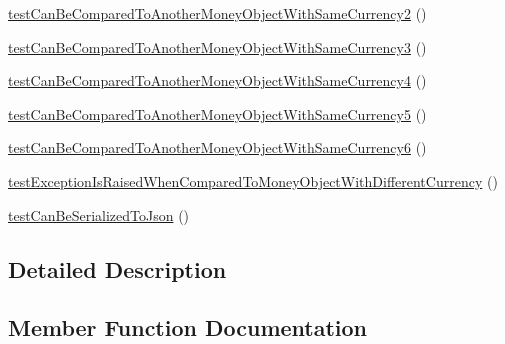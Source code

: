 \begin{DoxyCompactItemize}
\item 
\hyperlink{classSebastianBergmann_1_1Money_1_1MoneyTest_afdad35bd500a87de5765ab7b7a130a4d}{test\+Can\+Be\+Compared\+To\+Another\+Money\+Object\+With\+Same\+Currency2} ()
\item 
\hyperlink{classSebastianBergmann_1_1Money_1_1MoneyTest_a5c6950a2b492a71d2df55c6980288681}{test\+Can\+Be\+Compared\+To\+Another\+Money\+Object\+With\+Same\+Currency3} ()
\item 
\hyperlink{classSebastianBergmann_1_1Money_1_1MoneyTest_af6c446ab0c9910b834a885611ffafea5}{test\+Can\+Be\+Compared\+To\+Another\+Money\+Object\+With\+Same\+Currency4} ()
\item 
\hyperlink{classSebastianBergmann_1_1Money_1_1MoneyTest_a76d4e7b3209896aacdd71c81057ec505}{test\+Can\+Be\+Compared\+To\+Another\+Money\+Object\+With\+Same\+Currency5} ()
\item 
\hyperlink{classSebastianBergmann_1_1Money_1_1MoneyTest_a7eef02cd2ca9496785f5eac1f0339dbd}{test\+Can\+Be\+Compared\+To\+Another\+Money\+Object\+With\+Same\+Currency6} ()
\item 
\hyperlink{classSebastianBergmann_1_1Money_1_1MoneyTest_a9d1db77092880c644027301c166447d3}{test\+Exception\+Is\+Raised\+When\+Compared\+To\+Money\+Object\+With\+Different\+Currency} ()
\item 
\hyperlink{classSebastianBergmann_1_1Money_1_1MoneyTest_ab2c83f141e16316849d0212d2fbf6e13}{test\+Can\+Be\+Serialized\+To\+Json} ()
\end{DoxyCompactItemize}


\subsection{Detailed Description}


\subsection{Member Function Documentation}
\hypertarget{classSebastianBergmann_1_1Money_1_1MoneyTest_a7105012df0ad0bd66cd41660dd1ebac1}{}
